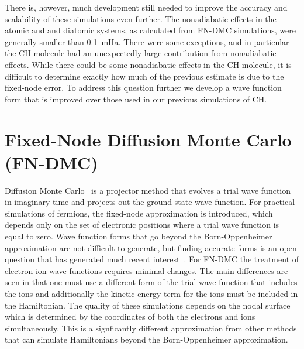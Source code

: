 \documentclass[aip,jcp,numerical,reprint]{revtex4-1}
\begin{document}
There is, however, much development still needed to improve the accuracy and scalability of these simulations even further.  The nonadiabatic effects in the atomic and and diatomic systems, as calculated from FN-DMC simulations,  were generally smaller than 0.1~mHa. There were some exceptions, and in particular the CH molecule had an unexpectedly large contribution from nonadiabatic effects. While there could be some nonadiabatic effects in the CH molecule, it is difficult to determine exactly how much of the previous estimate is due to the fixed-node error.   To address this question further we develop a wave function form that is improved over those used in our previous simulations of CH.


\section{Fixed-Node Diffusion Monte Carlo (FN-DMC)}
Diffusion Monte Carlo~\cite{Anderson_DMC,lester1,Stuart_Review,Needs_Review,Needs_Old_Review,QMC_Review} is a projector method that evolves a trial wave function in imaginary time and projects out the ground-state wave function. For practical simulations of fermions, the fixed-node approximation is introduced, which depends only on the set of electronic positions where a trial wave function is equal to zero.  %
  Wave function forms that go beyond the Born-Oppenheimer approximation are not difficult to generate, but finding accurate forms is an open question that has generated  much recent interest~\cite{cederbaum1,cederbaum12,Tubman_ECG,boent,gross2014}.  For FN-DMC the treatment of electron-ion wave functions requires minimal changes.  The main differences are seen in that one must use a different form of the trial wave function that includes the ions and additionally the  kinetic energy term for the ions must be included in the Hamiltonian.   The quality of these simulations depends on the nodal surface which  is determined by the  coordinates of both the electrons and ions simultaneously.  This is a signficantly different approximation from other methods that can simulate Hamiltonians beyond the Born-Oppenheimer approximation\cite{mitroy2013,Kurt_XCNEO-HF,Sharon_NEO-DFT,kerley2013}.%
\end{document}
